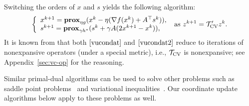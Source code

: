 {{%

Switching the orders of  $x$ and $s$ yields the following algorithm: %
\begin{equation}
\left\{
\begin{array}{l}
x^{k+1}=\prox_{\eta g}(x^k-\eta(\nabla f(x^k)+A^\top s^k)),\\
s^{k+1}=\prox_{\gamma h^*} (s^k+\gamma A(2x^{k+1}-x^k)),
\end{array}
\right.{\text{ as }z^{k+1}=\cT'_{\textnormal{CV}} z^k.}\label{vucondat2}
\end{equation}
It is known from \cite{combettes2014forward,davis2014convergence} that both $\eqref{vucondat}$ and $\eqref{vucondat2}$  reduce to iterations of nonexpansive operators (under a special metric), i.e., ${{\mathcal{T}}_{\textnormal{CV}}}$ is  nonexpansive; see Appendix~\ref{sec:vc-op} for the reasoning. %
\begin{remark}
Similar primal-dual algorithms can be used to solve other problems such as saddle point problems~\cite{lebedev1967duality,mclinden1974extension,briceno2013monotone} and variational inequalities~\cite{tseng1991applications}. Our coordinate update algorithms below apply to these problems as well.
\end{remark}
}}
